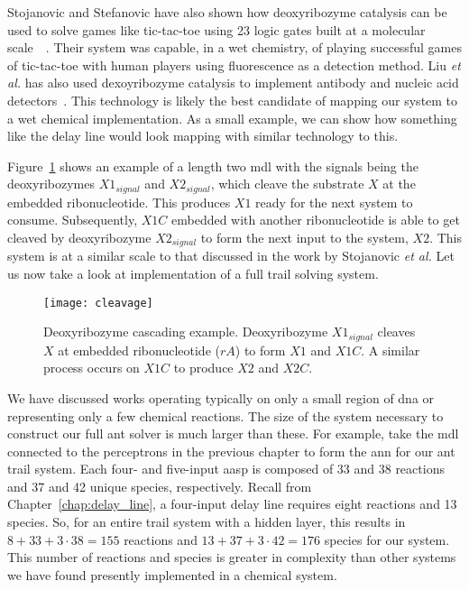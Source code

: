 Stojanovic and Stefanovic have also shown how deoxyribozyme catalysis can be used to solve games like tic-tac-toe using 23 logic gates built at a molecular scale~\cite{Stojanovic2003-eg}~\cite{Stojanovic2000-qx}. Their system was capable, in a wet chemistry, of playing successful games of tic-tac-toe with human players using fluorescence as a detection method. Liu \textit{et al.} has also used dexoyribozyme catalysis to implement antibody and nucleic acid detectors~\cite{Liu2009-jz}. This technology is likely the best candidate of mapping our system to a wet chemical implementation. As a small example, we can show how something like the delay line would look mapping with similar technology to this.

Figure~\ref{fig:deoxy1} shows an example of a length two \gls{mdl} with the signals being the deoxyribozymes $X1_{signal}$ and $X2_{signal}$, which cleave the substrate $X$ at the embedded ribonucleotide. This produces $X1$ ready for the next system to consume. Subsequently, $X1C$ embedded with another ribonucleotide is able to get cleaved by deoxyribozyme $X2_{signal}$ to form the next input to the system, $X2$. This system is at a similar scale to that discussed in the work by Stojanovic \textit{et al.} Let us now take a look at implementation of a full trail solving system.

\begin{figure}[ht]
	\centering
	\texttt{[image: cleavage]}
	\caption[Example of Deoxyribozyme Implementation]{Deoxyribozyme cascading example. Deoxyribozyme $X1_{signal}$ cleaves $X$ at embedded ribonucleotide ($rA$) to form $X1$ and $X1C$. A similar process occurs on $X1C$ to produce $X2$ and $X2C$.}
	\label{fig:deoxy1}
\end{figure}

We have discussed works operating typically on only a small region of \gls{dna} or representing only a few chemical reactions. The size of the system necessary to construct our full ant solver is much larger than these. For example, take the \gls{mdl} connected to the perceptrons in the previous chapter to form the \gls{ann} for our ant trail system. Each four- and five-input \gls{aasp} is composed of 33 and 38 reactions and 37 and 42 unique species, respectively. Recall from Chapter~\ref{chap:delay_line}, a four-input delay line requires eight reactions and 13 species. So, for an entire trail system with a hidden layer, this results in $8+33+3 \cdot 38=155$ reactions and $13+37+3 \cdot 42=176$ species for our system. This number of reactions and species is greater in complexity than other systems we have found presently implemented in a chemical system.

